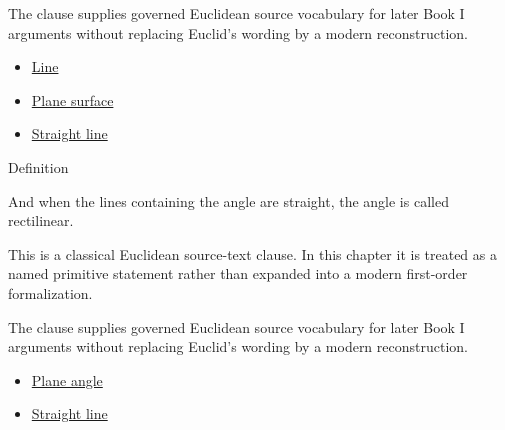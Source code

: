 \begin{remark*}[Interpretation]
The clause supplies governed Euclidean source vocabulary for later Book I
arguments without replacing Euclid's wording by a modern reconstruction.
\end{remark*}

\begin{lra-not-visible}
\begin{dependencies}
\begin{itemize}
  \item \hyperref[def:euclid-line]{Line}
  \item \hyperref[def:euclid-plane-surface]{Plane surface}
  \item \hyperref[def:euclid-straight-line]{Straight line}
\end{itemize}
\end{dependencies}
\end{lra-not-visible}

\begin{definitionbox}{Definition}
\begin{definition}
\label{def:euclid-rectilinear-angle}
And when the lines containing the angle are straight, the angle is called
rectilinear.
\end{definition}
\end{definitionbox}
\begin{remark*}
This is a classical Euclidean source-text clause. In this chapter it is treated
as a named primitive statement rather than expanded into a modern first-order
formalization.
\end{remark*}

\begin{remark*}[Interpretation]
The clause supplies governed Euclidean source vocabulary for later Book I
arguments without replacing Euclid's wording by a modern reconstruction.
\end{remark*}

\begin{lra-not-visible}
\begin{dependencies}
\begin{itemize}
  \item \hyperref[def:euclid-plane-angle]{Plane angle}
  \item \hyperref[def:euclid-straight-line]{Straight line}
\end{itemize}
\end{dependencies}
\end{lra-not-visible}

